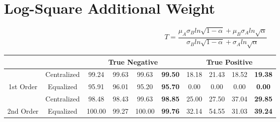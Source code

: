 \documentclass[10pt,a4paper]{article}
\begin{document}
	\section{Log-Square Additional Weight}
		$$
		T = \frac{\mu_A \sigma_B ln\sqrt{1 - \alpha}
			+ \mu_B \sigma_A ln\sqrt{\alpha}}
		{\sigma_B ln\sqrt{1 - \alpha} + \sigma_A ln\sqrt{\alpha}}
		$$
		\begin{table}[!h]
			\centering
			\begin{tabular}{|c|c|c|c|c|c|c|c|c|c|}
				\hline
				&             & \multicolumn{4}{c|}{True Negative}                              & \multicolumn{4}{c|}{True Positive}                            \\ \hline
				& Centralized & 99.24  & 99.63 & 99.63  & {\color[HTML]{FE0000} \textbf{99.50}} & 18.18 & 21.43 & 18.52 & {\color[HTML]{FE0000} \textbf{19.38}} \\ \cline{2-10} 
				\multirow{-2}{*}{1st Order} & Equalized   & 95.91  & 96.01 & 95.20  & {\color[HTML]{FE0000} \textbf{95.70}} & 0.00  & 0.00  & 0.00  & {\color[HTML]{FE0000} \textbf{0.00}}  \\ \hline
				& Centralized & 98.48  & 98.43 & 99.63  & {\color[HTML]{FE0000} \textbf{98.85}} & 25.00 & 27.50 & 37.04 & {\color[HTML]{FE0000} \textbf{29.85}} \\ \cline{2-10} 
				\multirow{-2}{*}{2nd Order} & Equalized   & 100.00 & 99.27 & 100.00 & {\color[HTML]{FE0000} \textbf{99.76}} & 32.14 & 54.55 & 31.03 & {\color[HTML]{FE0000} \textbf{39.24}} \\ \hline
			\end{tabular}
		\end{table}
	
\end{document}
